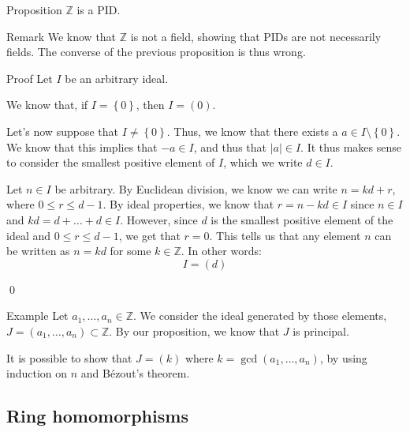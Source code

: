 \documentclass[a4paper]{article}
\begin{document}
\begin{parag}{Proposition}
    $\mathbb{Z}$ is a PID.

    \begin{subparag}{Remark}
        We know that $\mathbb{Z}$ is not a field, showing that PIDs are not necessarily fields. The converse of the previous proposition is thus wrong.
    \end{subparag}

    \begin{subparag}{Proof}
        Let $I$ be an arbitrary ideal. 

        We know that, if $I = \left\{0\right\}$, then $I = \left(0\right)$.

        Let's now suppose that $I \neq \left\{0\right\}$. Thus, we know that there exists a $a \in I \setminus \left\{0\right\}$. We know that this implies that $-a \in I$, and thus that $\left|a\right| \in I$. It thus makes sense to consider the smallest positive element of $I$, which we write $d \in I$.

        Let $n \in I$ be arbitrary. By Euclidean division, we know we can write $n = kd + r$, where $0 \leq r \leq d - 1$. By ideal properties, we know that $r = n - kd \in I$ since $n \in I$ and $kd = d + \ldots + d \in I$. However, since $d$ is the smallest positive element of the ideal and $0 \leq r \leq d -1$, we get that $r = 0$. This tells us that any element $n$ can be written as $n = kd$ for some $k \in \mathbb{Z}$. In other words: 
        \[I = \left(d\right)\]

        \qed
    \end{subparag}
\end{parag}

\begin{parag}{Example}
    Let $a_1, \ldots, a_n \in \mathbb{Z}$. We consider the ideal generated by those elements, $J = \left(a_1, \ldots, a_n\right) \subset \mathbb{Z}$. By our proposition, we know that $J$ is principal.

    It is possible to show that $J = \left(k\right)$ where $k = \gcd\left(a_1, \ldots, a_n\right)$, by using induction on $n$ and Bézout's theorem.
\end{parag}

\subsection{Ring homomorphisms}
\end{document}
